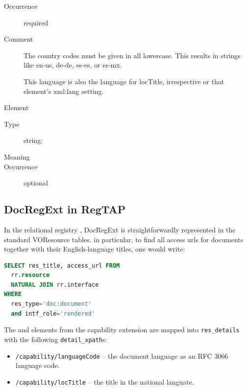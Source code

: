 \documentclass{ivoa}
\begin{document}
\begin{generated}
\begin{bigdescription}
\begin{description}
\item[Occurrence] required
\item[Comment] 
                The country codes must be given in all lowercase.  This
                results in strings like en-us, de-de, es-es, or es-mx.

                This language is also the language for locTitle, 
                irrespective or that element's xml:lang setting.
              

\end{description}
\item[Element \xmlel{locTitle}]
\begin{description}
\item[Type] string: 
\item[Meaning] 
\item[Occurrence] optional

\end{description}


\end{bigdescription}\endgroup

\endgroup
\end{generated}


\subsection{DocRegExt in RegTAP}
\label{sect:docregext-regtap}

In the relational registry \citep{2014ivoa.spec.1208D}, DocRegExt is
straightforwardly represented in the standard VOResource tables.  in
particular, to find all access urls for documents together with their
English-language titles, one would write:

\begin{lstlisting}[language=SQL]
SELECT res_title, access_url FROM
  rr.resource 
  NATURAL JOIN rr.interface
WHERE
  res_type='doc:document'
  and intf_role='rendered'
\end{lstlisting}

The  and  elements from the
 capability extension are mapped into
\verb|res_details| with the following \verb|detail_xpath|s:

\begin{itemize}

\item \texttt{/capability/languageCode} -- the document language as an RFC
3066 language code.
\item \texttt{/capability/locTitle} -- the title in the national
languate.
\end{itemize}
\end{document}
